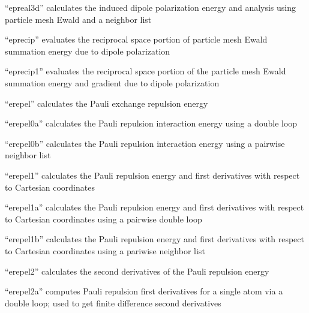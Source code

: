 \documentclass[letterpaper,11pt,english]{sphinxmanual}
\begin{document}

“epreal3d” calculates the induced dipole polarization energy
and analysis using particle mesh Ewald and a neighbor list


“eprecip” evaluates the reciprocal space portion of particle
mesh Ewald summation energy due to dipole polarization


“eprecip1” evaluates the reciprocal space portion of the particle
mesh Ewald summation energy and gradient due to dipole polarization



“erepel” calculates the Pauli exchange repulsion energy


“erepel0a” calculates the Pauli repulsion interaction energy
using a double loop


“erepel0b” calculates the Pauli repulsion interaction energy
using a pairwise neighbor list


“erepel1” calculates the Pauli repulsion energy and first
derivatives with respect to Cartesian coordinates


“erepel1a” calculates the Pauli repulsion energy and first
derivatives with respect to Cartesian coordinates using a
pairwise double loop


“erepel1b” calculates the Pauli repulsion energy and first
derivatives with respect to Cartesian coordinates using a
pariwise neighbor list


“erepel2” calculates the second derivatives of the Pauli
repulsion energy


“erepel2a” computes Pauli repulsion first derivatives for a
single atom via a double loop; used to get finite difference
second derivatives
\end{document}
